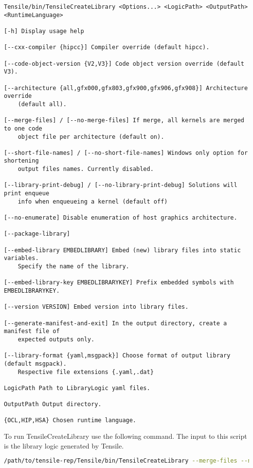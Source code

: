 \documentclass[]{article}
\begin{document}
\begin{lstlisting}
Tensile/bin/TensileCreateLibrary <Options...> <LogicPath> <OutputPath> <RuntimeLanguage>

[-h] Display usage help

[--cxx-compiler {hipcc}] Compiler override (default hipcc).

[--code-object-version {V2,V3}] Code object version override (default V3).

[--architecture {all,gfx000,gfx803,gfx900,gfx906,gfx908}] Architecture override
    (default all).

[--merge-files] / [--no-merge-files] If merge, all kernels are merged to one code
    object file per architecture (default on).

[--short-file-names] / [--no-short-file-names] Windows only option for shortening
    output files names. Currently disabled.

[--library-print-debug] / [--no-library-print-debug] Solutions will print enqueue
    info when enqueueing a kernel (default off)

[--no-enumerate] Disable enumeration of host graphics architecture.

[--package-library]

[--embed-library EMBEDLIBRARY] Embed (new) library files into static variables.
    Specify the name of the library.

[--embed-library-key EMBEDLIBRARYKEY] Prefix embedded symbols with EMBEDLIBRARYKEY.

[--version VERSION] Embed version into library files.

[--generate-manifest-and-exit] In the output directory, create a manifest file of
    expected outputs only.

[--library-format {yaml,msgpack}] Choose format of output library (default msgpack).
    Respective file extensions {.yaml,.dat}

LogicPath Path to LibraryLogic yaml files.

OutputPath Output directory.

{OCL,HIP,HSA} Chosen runtime language.
\end{lstlisting}

\noindent
To run TensileCreateLibrary use the following command. The input to this script is the library logic generated by Tensile.

\begin{lstlisting}[language=bash]
/path/to/tensile-rep/Tensile/bin/TensileCreateLibrary --merge-files --no-short-file-names --no-library-print-debug --code-object-version=V3 --cxx-compiler=hipcc --library-format=msgpack path/to/new/logic path/to/drop/new/tensile HIP
\end{lstlisting}
\end{document}
